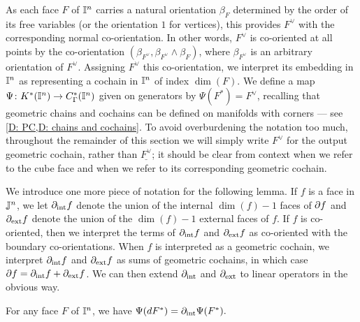 As each face $F$ of $\mathbb{I}^n$ carries a natural orientation $\beta_F$ determined by the order of its free variables (or the orientation $1$ for vertices), this provides $F^\vee$ with the corresponding normal co-orientation.
In other words, $F^\vee$ is co-oriented at all points by the co-orientation $(\beta_{F^\vee}, \beta_{F^\vee} \wedge \beta_F)$, where $\beta_{F^\vee}$ is an arbitrary orientation of $F^\vee$.
Assigning $F^\vee$ this co-orientation, we interpret its embedding in $\mathbb{I}^n$ as representing a cochain in $\mathbb{I}^n$ of index $\dim(F)$.
We define a map $\Psi \colon K^*(\mathbb{I}^n) \to C_\Gamma^*(\mathbb{I}^n)$ given on generators by $\Psi(F^*) = F^\vee$, recalling that geometric chains and cochains can be defined on manifolds with corners --- see \cref{D: PC,D: chains and cochains}.
To avoid overburdening the notation too much, throughout the remainder of this section we will simply write $F^\vee$ for the output geometric cochain, rather than $\underline{F^\vee}$; it should be clear from context when we refer to the cube face and when we refer to its corresponding geometric cochain.

We introduce one more piece of notation for the following lemma.
If $f$ is a face in $\mathbb{J}^n$, we let $\partial_{\text{int}}f$ denote the union of the internal $\dim(f)-1$ faces of $\partial f$ and $\partial_{\text{ext}}f$ denote the union of the $\dim(f)-1$ external faces of $f$.
If $f$ is co-oriented, then we interpret the terms of $\partial_{\text{int}}f$ and $\partial_{\text{ext}}f$ as co-oriented with the boundary co-orientations.
When $f$ is interpreted as a geometric cochain, we interpret $\partial_{\text{int}}f$ and $\partial_{\text{ext}}f$ as sums of geometric cochains, in which case $\partial f = \partial_{\text{int}}f + \partial_{\text{ext}}f$.
We can then extend $\partial_{\text{int}}$ and $\partial_{\text{ext}}$ to linear operators in the obvious way.

\begin{lemma}\label{L: dualizing bijection}
	For any face $F$ of $\mathbb{I}^n$, we have $\Psi(d F^*) = \partial_{\text{int}}\Psi(F^*).$
\end{lemma}

